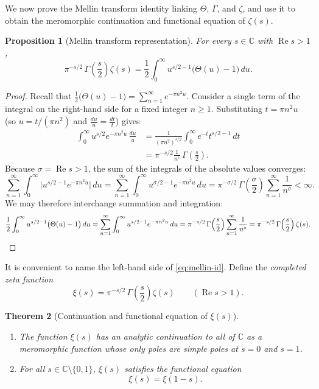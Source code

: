 \documentclass[11pt]{article}
\theoremstyle{plain}
\newtheorem{theorem}{Theorem}[section]
\newtheorem{proposition}[theorem]{Proposition}
\theoremstyle{definition}
\theoremstyle{boldremark}
\theoremstyle{remark}
\numberwithin{equation}{section}
\newcommand{\C}{\mathbb{C}}
\DeclareMathOperator{\Real}{Re}
\begin{document}
We now prove the Mellin transform identity linking $\Theta$, $\Gamma$, and
$\zeta$, and use it to obtain the meromorphic continuation and functional
equation of $\zeta(s)$.

\begin{proposition}[Mellin transform representation]\label{prop:mellin-proof}
For every $s\in\C$ with $\Real s > 1$,
\begin{equation}\label{eq:mellin-id}
 \boxed{\displaystyle
  \pi^{-s/2}\,\Gamma\!\left(\frac{s}{2}\right)\zeta(s)
  = \frac{1}{2}\int_0^{\infty} u^{s/2-1}\bigl(\Theta(u)-1\bigr)\,du.}
\end{equation}
\end{proposition}

\begin{proof}
Recall that $\frac{1}{2}\bigl(\Theta(u)-1\bigr)=\sum_{n=1}^{\infty} e^{-\pi n^2 u}$.
Consider a single term of the integral on the right-hand side for a fixed
integer $n\geq 1$. Substituting $t=\pi n^2 u$ (so $u=t/(\pi n^2)$ and
$\frac{du}{u}=\frac{dt}{t}$) gives
\begin{align*}
 \int_0^{\infty} u^{s/2} e^{-\pi n^2 u}\,\frac{du}{u}
 &= \frac{1}{(\pi n^2)^{s/2}}\int_0^{\infty} e^{-t} t^{s/2-1}\,dt \\
 &= \pi^{-s/2}\frac{1}{n^s}\,\Gamma\!\left(\frac{s}{2}\right).
\end{align*}
Because $\sigma=\Real s > 1$, the sum of the integrals of the absolute
values converges:
\[
 \sum_{n=1}^{\infty}\int_0^{\infty}\bigl|u^{s/2-1}e^{-\pi n^2 u}\bigr|\,du
 = \sum_{n=1}^{\infty}\int_0^{\infty} u^{\sigma/2-1}e^{-\pi n^2 u}\,du
 = \pi^{-\sigma/2}\,\Gamma\!\left(\frac{\sigma}{2}\right)\sum_{n=1}^{\infty}\frac{1}{n^{\sigma}}
 < \infty.
\]
We may therefore interchange summation and integration:
\[
 \frac{1}{2}\int_0^{\infty} u^{s/2-1}\bigl(\Theta(u)-1\bigr)\,du
 = \sum_{n=1}^{\infty}\int_0^{\infty} u^{s/2-1}e^{-\pi n^2 u}\,du
 = \pi^{-s/2}\,\Gamma\!\left(\frac{s}{2}\right)\sum_{n=1}^{\infty}\frac{1}{n^s}
 = \pi^{-s/2}\,\Gamma\!\left(\frac{s}{2}\right)\zeta(s). \qedhere
\]
\end{proof}

It is convenient to name the left-hand side of \eqref{eq:mellin-id}. Define
the \emph{completed zeta function}
\[
 \xi(s) = \pi^{-s/2}\,\Gamma\!\left(\frac{s}{2}\right)\zeta(s)
 \qquad (\Real s > 1).
\]

\begin{theorem}[Continuation and functional equation of $\xi(s)$]\label{thm:xi-cont}
\leavevmode
\begin{enumerate}[label=\textup{(\arabic*)}]
 \item The function $\xi(s)$ has an analytic continuation to all of $\C$ as
       a meromorphic function whose only poles are simple poles at $s=0$
       and $s=1$.
 \item For all $s\in\C\setminus\{0,1\}$, $\xi(s)$ satisfies the
       \emph{functional equation}
       \begin{equation}\label{eq:func-eq}
        \boxed{\displaystyle \xi(s) = \xi(1-s).}
       \end{equation}
\end{enumerate}
\end{theorem}
\end{document}
